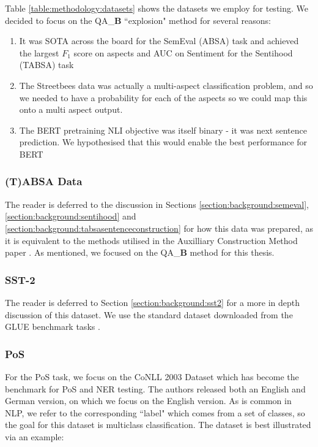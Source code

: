 Table \ref{table:methodology:datasets} shows the datasets we employ for testing. We decided to focus on the QA\_\textbf{B} ``explosion" method for several reasons:
\begin{enumerate}
	\item It was SOTA across the board for the SemEval (ABSA) task and achieved the largest $F_1$ score on aspects and AUC on Sentiment for the Sentihood (TABSA) task
	\item The Streetbees data was actually a multi-aspect classification problem, and so we needed to have a probability for each of the aspects so we could map this onto a multi aspect output.
	\item The BERT pretraining NLI objective was itself binary - it was next sentence prediction. We hypothesised that this would enable the best performance for BERT
\end{enumerate}

\subsubsection{(T)ABSA Data}
The reader is deferred to the discussion in Sections \ref{section:background:semeval}, \ref{section:background:sentihood} and \ref{section:background:tabsasentenceconstruction} for how this data was prepared, as it is equivalent to the methods utilised in the Auxilliary Construction Method paper \cite{Sun2019}. As mentioned, we focused on the QA\_\textbf{B} method for this thesis.

\subsubsection{SST-2}
The reader is deferred to Section \ref{section:background:sst2} for a more in depth discussion of this dataset. We use the standard dataset downloaded from the GLUE benchmark tasks \cite{Wang2018}.

\subsubsection{PoS}
For the PoS task, we focus on the CoNLL 2003 Dataset \cite{Tjong} which has become the benchmark for PoS and NER testing. The authors released both an English and German version, on which we focus on the English version. As is common in NLP, we refer to the corresponding ``label" which comes from a set of classes, so the goal for this dataset is multiclass classification. The dataset is best illustrated via an example:

